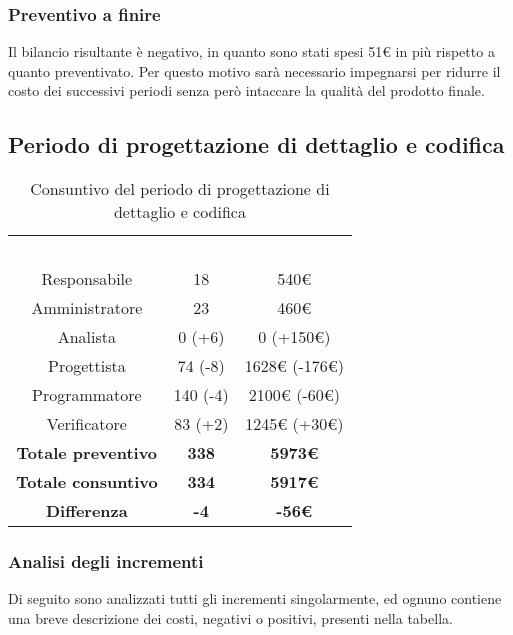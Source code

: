 \subsubsection{Preventivo a finire}
Il bilancio risultante è negativo, in quanto sono stati spesi 51€ in più rispetto a quanto preventivato. Per questo motivo sarà necessario impegnarsi per ridurre il costo dei successivi periodi senza però intaccare la qualità del prodotto finale.

\subsection{Periodo di progettazione di dettaglio e codifica}
\begin{table}[H]
\centering\renewcommand{\arraystretch}{1.5}
\caption{Consuntivo del periodo di progettazione di dettaglio e codifica}
\vspace{0.2cm}
\begin{tabular}{ c c c }
\rowcolor{redafk}
\textcolor{white}{\textbf{Ruolo}} & \textcolor{white}{\textbf{Ore}} &
\textcolor{white}{\textbf{Costo}}  \\
Responsabile 	& 18 & 540€ \\
Amministratore 	&  23	& 460€ \\
Analista 		& 0 (+6)  & 0 (+150€) \\
Progettista		&  74 (-8) & 1628€ (-176€)\\
Programmatore	&  	140 (-4)& 2100€ (-60€)\\
Verificatore 	& 83 (+2) &  1245€ (+30€)\\
\textbf{Totale preventivo} & \textbf{338} & \textbf{5973€}  \\
\textbf{Totale consuntivo} & \textbf{334} & \textbf{5917€} \\
\rowcolor{lastrowcolor}
\textbf{Differenza} & \textbf{-4} & \textbf{-56€} \\
\end{tabular}
\end{table}

\subsubsection{Analisi degli incrementi}
Di seguito sono analizzati tutti gli incrementi singolarmente, ed ognuno contiene una breve descrizione dei costi, negativi o positivi, presenti nella tabella.

